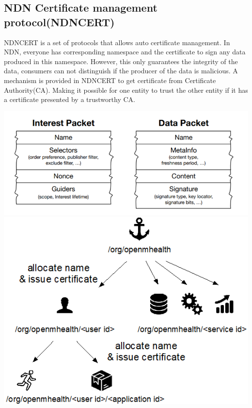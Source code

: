 \documentclass[a0,portrait]{poster}
\begin{document}
\begin{multicols}{2}
\subsection*{NDN Certificate management protocol(NDNCERT)\cite{zhang2017ndncert}}
\par
	NDNCERT is a set of protocols that allows auto certificate management.
	In NDN, everyone has corresponding namespace and the certificate to sign any data produced in this namespace.
	However, this only guarantees the integrity of the data, consumers can not distinguish if the producer of the data is malicious.
	A mechanism is provided in NDNCERT to get certificate from Certificate Authority(CA).
	Making it possible for one entity to trust the other entity if it has a certificate presented by a trustworthy CA.
\par
\begin{minipage}[b]{0.55\linewidth}
	\includegraphics[width=\linewidth]{figures/packet.png}
	\includegraphics[width=\linewidth]{figures/NDNfit.png}

\end{minipage}
\end{multicols}
\end{document}
